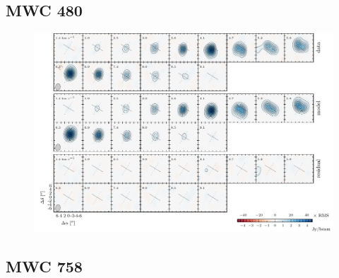 \documentclass{aastex6}
\begin{document}
\subsection{MWC 480}
\begin{figure}[htb]
\begin{center}
  \includegraphics{MWC480.pdf}
  \end{center}
\end{figure}

\subsection{MWC 758}
\end{document}
